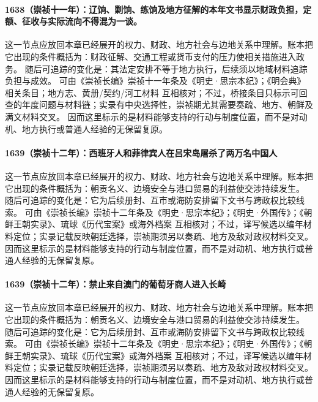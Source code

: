 \paragraph{1638（崇祯十一年）：辽饷、剿饷、练饷及地方征解的本年文书显示财政负担，定额、征收与实际流向不得混为一谈。} 这一节点应放回本章已经展开的权力、财政、地方社会与边地关系中理解。账本把它出现的条件概括为：财政征解、交通工程或货币支付的压力使相关措施进入政务。 随后可追踪的变化是：其法定安排不等于地方执行，后续须以地域材料追踪负担与成效。 可由《崇祯长编》崇祯十一年条及《明史·思宗本纪》；《明会典》相关条目；地方志、黄册/契约/河工材料 互相核对；不过，桥接条目只标示可回查的年度问题与材料链；实录有中央选择性，崇祯期尤其需要奏疏、地方、朝鲜及满文材料交叉。 因而这里标示的是材料能够支持的行动与制度位置，而不是对动机、地方执行或普通人经验的无保留复原。

\paragraph{1639（崇祯十二年）：西班牙人和菲律宾人在吕宋岛屠杀了两万名中国人} 这一节点应放回本章已经展开的权力、财政、地方社会与边地关系中理解。账本把它出现的条件概括为：朝贡名义、边境安全与港口贸易的利益使交涉持续发生。 随后可追踪的变化是：它为后续册封、互市或海防安排留下文书与跨政权比较线索。 可由《崇祯长编》崇祯十二年条及《明史·思宗本纪》；《明史·外国传》；《朝鲜王朝实录》、琉球《历代宝案》或海外档案 互相核对；不过，译写候选以编年材料定位；实录记载反映朝廷选择，崇祯期须另以奏疏、地方及敌对政权材料交叉。 因而这里标示的是材料能够支持的行动与制度位置，而不是对动机、地方执行或普通人经验的无保留复原。

\paragraph{1639（崇祯十二年）：禁止来自澳门的葡萄牙商人进入长崎} 这一节点应放回本章已经展开的权力、财政、地方社会与边地关系中理解。账本把它出现的条件概括为：朝贡名义、边境安全与港口贸易的利益使交涉持续发生。 随后可追踪的变化是：它为后续册封、互市或海防安排留下文书与跨政权比较线索。 可由《崇祯长编》崇祯十二年条及《明史·思宗本纪》；《明史·外国传》；《朝鲜王朝实录》、琉球《历代宝案》或海外档案 互相核对；不过，译写候选以编年材料定位；实录记载反映朝廷选择，崇祯期须另以奏疏、地方及敌对政权材料交叉。 因而这里标示的是材料能够支持的行动与制度位置，而不是对动机、地方执行或普通人经验的无保留复原。

